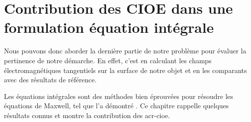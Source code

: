 \chapter{Contribution des CIOE dans une formulation équation intégrale}
\label{sec:equation_integrale}
\minitoc
\newpage
{}
Nous pouvons donc aborder la dernière partie de notre problème pour évaluer la pertinence de notre démarche. En effet, c'est en calculant les champs électromagnétiques tangentiels sur la surface de notre objet et en les comparants avec des résultats de référence.

Les équations intégrales sont des méthodes bien éprouvées pour résoudre les équations de Maxwell, tel que l'a démontré \cite{nedelec_acoustic_2001}. Ce chapitre rappelle quelques résultats connus et montre la contribution des \gls{acr-cioe}.





